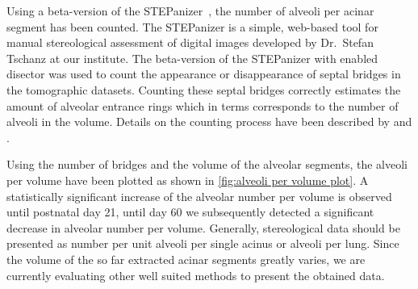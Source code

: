 Using a beta-version of the STEPanizer~\cite[available \href{http://stepanizer.com/}{online}]{Tschanz2010}, the number of alveoli per acinar segment has been counted. The STEPanizer is a simple, web-based tool for manual stereological assessment of digital images developed by Dr.\ Stefan Tschanz at our institute. The beta-version of the STEPanizer with enabled disector was used to count the appearance or disappearance of septal bridges in the tomographic datasets. Counting these septal bridges correctly estimates the amount of alveolar entrance rings which in terms corresponds to the number of alveoli in the volume. Details on the counting process have been described by \citet{Hyde2004} and \citet{Ochs2004}.

Using the number of bridges and the volume of the alveolar segments, the alveoli per volume have been plotted as shown in \autoref{fig:alveoli per volume plot}. A statistically significant increase of the alveolar number per volume is observed until postnatal day 21,  until day 60 we subsequently detected a significant decrease in alveolar number per volume. Generally, stereological data should be presented as number per unit \eg alveoli per single acinus or alveoli per lung. Since the volume of the so far extracted acinar segments  greatly varies, we are currently evaluating other well suited methods to present the obtained data.

